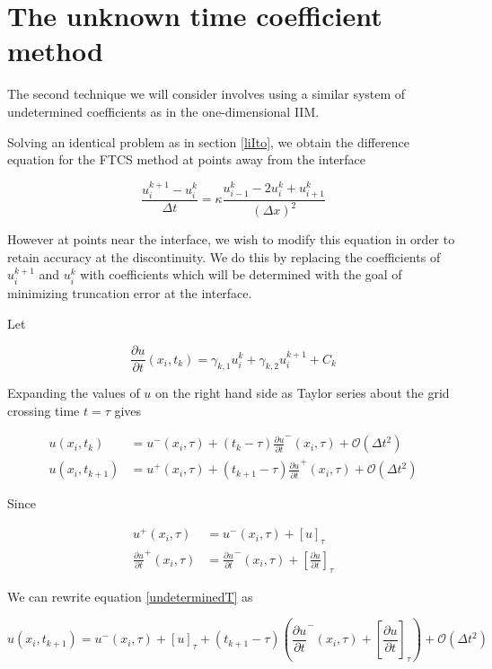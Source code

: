 \section{The unknown time coefficient method}
The second technique we will consider involves using a similar system of undetermined coefficients as in the one-dimensional IIM.

Solving an identical problem as in section \ref{liIto}, we obtain the difference equation for the FTCS method at points away from the interface

\begin{equation}
    \frac{u_i^{k+1} - u_i^k}{\Delta t} = \kappa \frac{u_{i-1}^k - 2 u_i^k + u_{i+1}^k}{(\Delta x)^2}
\end{equation}

However at points near the interface, we wish to modify this equation in order to retain accuracy at the discontinuity.
We do this by replacing the coefficients of $u_i^{k+1}$ and $u_i^k$ with coefficients which will be determined with the goal of minimizing truncation error at the interface.

Let

\begin{equation}
    \frac{\partial u}{\partial t}(x_i,t_k) = \gamma_{k,1} u_i^k + \gamma_{k,2} u_i^{k+1} + C_k
\end{equation}

Expanding the values of $u$ on the right hand side as Taylor series about the grid crossing time $t=\tau$ gives

\begin{align}
    u(x_i,t_k) &= u^-(x_i,\tau) + (t_k - \tau)\frac{\partial u}{\partial t}^-(x_i,\tau) + \mathcal{O}(\Delta t^2) \\
    u(x_i,t_{k+1}) &= u^+(x_i,\tau) + (t_{k+1} - \tau)\frac{\partial u}{\partial t}^+(x_i,\tau) + \mathcal{O}(\Delta t^2) \label{undeterminedT}
\end{align}

Since

\begin{align}
    u^+(x_i,\tau) &= u^-(x_i,\tau) + [u]_\tau \\
    \frac{\partial u}{\partial t}^+(x_i,\tau) &= \frac{\partial u}{\partial t}^-(x_i,\tau) + \left[\frac{\partial u}{\partial t}\right]_\tau
\end{align}

We can rewrite equation \ref{undeterminedT} as

\begin{equation}
    u(x_i,t_{k+1}) = u^-(x_i,\tau) + [u]_\tau + (t_{k+1} - \tau)\left(\frac{\partial u}{\partial t}^-(x_i,\tau) + \left[\frac{\partial u}{\partial t}\right]_\tau\right) + \mathcal{O}(\Delta t^2)
\end{equation}

